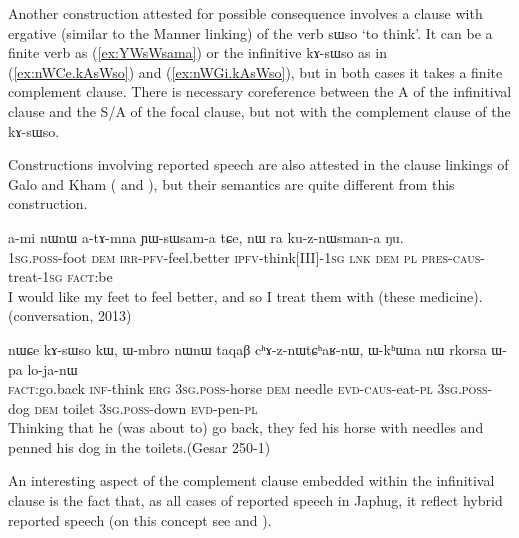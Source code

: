 \documentclass[oldfontcommands,oneside,a4paper,11pt]{article}
\newcommand{\ipa}[1]{{\phon \mbox{#1}}} %
\newcommand{\refb}[1]{(\ref{#1})}
\begin{document}
 Another construction attested for possible consequence involves a clause with ergative (similar to the Manner linking) of the verb \ipa{sɯso} `to think'. It can be a finite verb as \refb{ex:YWsWsama} or the infinitive \ipa{kɤ-sɯso} as in \refb{ex:nWCe.kAsWso} and \refb{ex:nWGi.kAsWso}, but in both cases it  takes a finite complement clause.  There is necessary coreference between the A of the infinitival clause and the S/A of the focal clause, but not with the complement clause of the  \ipa{kɤ-sɯso}. 
 
 Constructions involving reported speech are also attested in the clause linkings  of Galo and Kham  (\citealt[86, 88]{post09linking} and \citealt[110]{watters09kham}), but their semantics are quite different from this construction.
 
   \begin{exe}
\ex \label{ex:YWsWsama}
\gll 
\ipa{a-mi}  	\ipa{nɯnɯ}  	\ipa{a-tɤ-mna}  	\ipa{ɲɯ-sɯsam-a}  	\ipa{tɕe,}  	\ipa{nɯ} \ipa{ra}  	\ipa{ku-z-nɯsman-a}  	\ipa{ŋu.}   \\
\textsc{1sg.poss}-foot \textsc{dem} \textsc{irr-pfv}-feel.better  \textsc{ipfv}-think[III]-\textsc{1sg} \textsc{lnk} \textsc{dem} \textsc{pl} \textsc{pres-caus}-treat-\textsc{1sg}  \textsc{fact}:be \\
\glt I would like my feet to feel better, and so I treat them with (these medicine). (conversation, 2013)
  \end{exe}
 
  \begin{exe}
\ex \label{ex:nWCe.kAsWso}
\gll 
\ipa{nɯɕe}  	\ipa{kɤ-sɯso}  	\ipa{kɯ,}  	\ipa{ɯ-mbro}  	\ipa{nɯnɯ}  	\ipa{taqaβ}  	\ipa{cʰɤ-z-nɯtɕʰaʁ-nɯ,}  	\ipa{ɯ-kʰɯna}  	\ipa{nɯ}  	\ipa{rkorsa}  	\ipa{ɯ-pa}  	\ipa{lo-ja-nɯ}  \\
\textsc{fact}:go.back \textsc{inf}-think \textsc{erg} \textsc{3sg.poss}-horse \textsc{dem} needle \textsc{evd-caus}-eat-\textsc{pl}   \textsc{3sg.poss}-dog \textsc{dem} toilet \textsc{3sg.poss}-down \textsc{evd}-pen-\textsc{pl} \\
\glt Thinking that he (was about to) go back, they fed his horse with needles and penned his dog in the toilets.(Gesar 250-1)
 \end{exe}
 
An interesting aspect  of the complement clause embedded within the infinitival clause is the fact that, as all cases of reported speech in Japhug, it reflect hybrid reported speech (on this concept see \citealt{tournadre08conjunct} and \citealt{aikhenvald08semidirect}).
 
\end{document}
